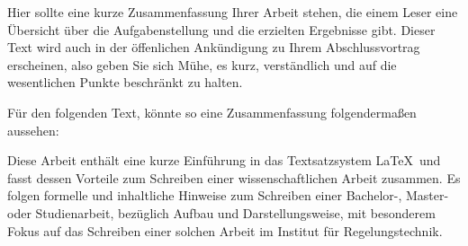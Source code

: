 Hier sollte eine kurze Zusammenfassung Ihrer Arbeit stehen, die einem Leser eine Übersicht über die Aufgabenstellung und die erzielten Ergebnisse gibt.
Dieser Text wird auch in der öffenlichen Ankündigung zu Ihrem Abschlussvortrag erscheinen, also geben Sie sich Mühe, es kurz, verständlich und auf die wesentlichen Punkte beschränkt zu halten.

Für den folgenden Text, könnte so eine Zusammenfassung folgendermaßen aussehen:

Diese Arbeit enthält eine kurze Einführung in das Textsatzsystem \LaTeX\ und fasst dessen Vorteile zum Schreiben einer wissenschaftlichen Arbeit zusammen. 
Es folgen formelle und inhaltliche Hinweise zum Schreiben einer Bachelor-, Master- oder Studienarbeit, bezüglich Aufbau und Darstellungsweise, mit besonderem 
Fokus auf das Schreiben einer solchen Arbeit im Institut für Regelungstechnik. 